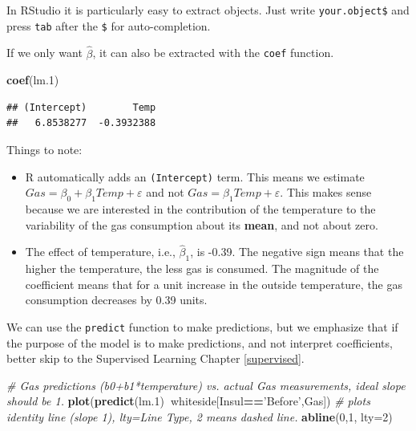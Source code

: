 \documentclass[]{book}
\newenvironment{Shaded}{\begin{snugshade}}{\end{snugshade}}
\newcommand{\KeywordTok}[1]{\textcolor[rgb]{0.13,0.29,0.53}{\textbf{#1}}}
\newcommand{\DataTypeTok}[1]{\textcolor[rgb]{0.13,0.29,0.53}{#1}}
\newcommand{\DecValTok}[1]{\textcolor[rgb]{0.00,0.00,0.81}{#1}}
\newcommand{\StringTok}[1]{\textcolor[rgb]{0.31,0.60,0.02}{#1}}
\newcommand{\CommentTok}[1]{\textcolor[rgb]{0.56,0.35,0.01}{\textit{#1}}}
\newcommand{\OperatorTok}[1]{\textcolor[rgb]{0.81,0.36,0.00}{\textbf{#1}}}
\newcommand{\NormalTok}[1]{#1}
\theoremstyle{definition}
\theoremstyle{definition}
\theoremstyle{definition}
\theoremstyle{remark}
\begin{document}
In RStudio it is particularly easy to extract objects. Just write
\texttt{your.object\$} and press \texttt{tab} after the \texttt{\$} for
auto-completion.

If we only want \(\hat \beta\), it can also be extracted with the
\texttt{coef} function.

\begin{Shaded}
\begin{Highlighting}[]
\KeywordTok{coef}\NormalTok{(lm.}\DecValTok{1}\NormalTok{)}
\end{Highlighting}
\end{Shaded}

\begin{verbatim}
## (Intercept)        Temp 
##   6.8538277  -0.3932388
\end{verbatim}

Things to note:

\begin{itemize}
\item
  R automatically adds an \texttt{(Intercept)} term. This means we
  estimate \(Gas=\beta_0 + \beta_1 Temp + \varepsilon\) and not
  \(Gas=\beta_1 Temp + \varepsilon\). This makes sense because we are
  interested in the contribution of the temperature to the variability
  of the gas consumption about its \textbf{mean}, and not about zero.
\item
  The effect of temperature, i.e., \(\hat \beta_1\), is -0.39. The
  negative sign means that the higher the temperature, the less gas is
  consumed. The magnitude of the coefficient means that for a unit
  increase in the outside temperature, the gas consumption decreases by
  0.39 units.
\end{itemize}

We can use the \texttt{predict} function to make predictions, but we
emphasize that if the purpose of the model is to make predictions, and
not interpret coefficients, better skip to the Supervised Learning
Chapter \ref{supervised}.

\begin{Shaded}
\begin{Highlighting}[]
\CommentTok{# Gas predictions (b0+b1*temperature) vs. actual Gas measurements, ideal slope should be 1.}
\KeywordTok{plot}\NormalTok{(}\KeywordTok{predict}\NormalTok{(lm.}\DecValTok{1}\NormalTok{)}\OperatorTok{~}\NormalTok{whiteside[Insul}\OperatorTok{==}\StringTok{'Before'}\NormalTok{,Gas])}
\CommentTok{# plots identity line (slope 1), lty=Line Type, 2 means dashed line.}
\KeywordTok{abline}\NormalTok{(}\DecValTok{0}\NormalTok{,}\DecValTok{1}\NormalTok{, }\DataTypeTok{lty=}\DecValTok{2}\NormalTok{)}
\end{Highlighting}
\end{Shaded}
\end{document}
